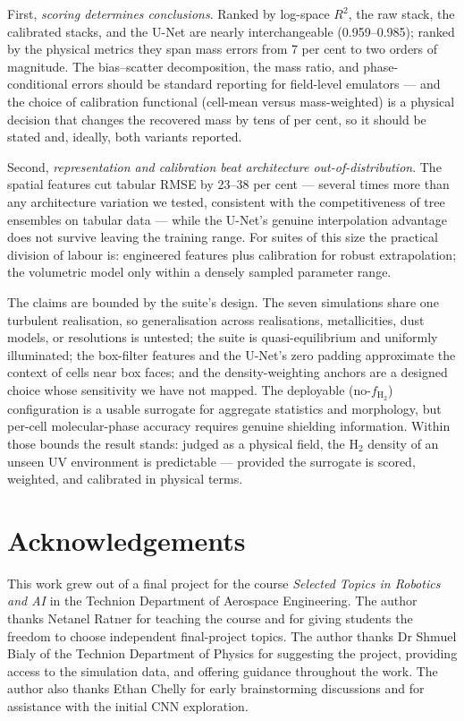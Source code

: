 \documentclass[fleqn,usenatbib]{rasti}
\newcommand{\fshield}{f_{\mathrm{H_2}}}
\newcommand{\Rsq}{R^2}
\begin{document}
First, \emph{scoring determines conclusions}. Ranked by log-space
\(\Rsq\), the raw stack, the calibrated stacks, and the U-Net are
nearly interchangeable (0.959--0.985); ranked by the physical metrics
they span mass errors from 7 per cent to two orders of magnitude. The
bias--scatter decomposition, the mass ratio, and phase-conditional
errors should be standard reporting for field-level emulators
--- and the choice of calibration functional (cell-mean versus
mass-weighted) is a physical decision that changes the recovered mass
by tens of per cent, so it should be stated and, ideally, both variants
reported.

Second, \emph{representation and calibration beat architecture
out-of-distribution}. The spatial features cut tabular RMSE by
23--38 per cent --- several times more than any architecture variation
we tested, consistent with the competitiveness of tree ensembles on
tabular data \citep{Grinsztajn2022} --- while the U-Net's genuine
interpolation advantage does not survive leaving the training range.
For suites of this size the practical division of labour is: engineered
features plus calibration for robust extrapolation; the volumetric
model only within a densely sampled parameter range.

The claims are bounded by the suite's design. The seven simulations
share one turbulent realisation, so generalisation across realisations,
metallicities, dust models, or resolutions is untested; the suite is
quasi-equilibrium and uniformly illuminated; the box-filter features
and the U-Net's zero padding approximate the context of cells near box
faces; and the density-weighting anchors are a designed choice whose
sensitivity we have not mapped. The deployable (no-\(\fshield\))
configuration is a usable surrogate for aggregate statistics and
morphology, but per-cell molecular-phase accuracy requires genuine
shielding information. Within those bounds the result stands: judged as
a physical field, the H\(_2\) density of an unseen UV environment is
predictable --- provided the surrogate is scored, weighted, and
calibrated in physical terms.

\section*{Acknowledgements}
This work grew out of a final project for the course \emph{Selected
Topics in Robotics and AI} in the Technion Department of Aerospace
Engineering. The author thanks Netanel Ratner for teaching the course
and for giving students the freedom to choose independent final-project
topics. The author thanks Dr Shmuel Bialy of the Technion Department of
Physics for suggesting the project, providing access to the simulation
data, and offering guidance throughout the work. The author also thanks
Ethan Chelly for early brainstorming discussions and for assistance
with the initial CNN exploration.
\end{document}
